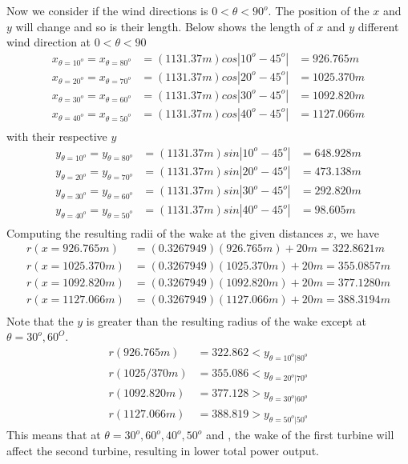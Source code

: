     Now we consider if the wind directions is $0<\theta<90^{o}$. The position of the $x$ and $y$ will change and so is their length. Below shows the length of $x$ and $y$
    different wind direction at $0<\theta<90$   
        \begin{align*}
            x_{\theta=10^{o}} = x_{\theta=80^{o}} &= (1131.37m)cos|10^{o}-45^{o}| &= 926.765m \\ 
            x_{\theta=20^{o}} = x_{\theta=70^{o}} &= (1131.37m)cos|20^{o}-45^{o}| &= 1025.370m \\ 
            x_{\theta=30^{o}} = x_{\theta=60^{o}} &= (1131.37m)cos|30^{o}-45^{o}| &= 1092.820m \\ 
            x_{\theta=40^{o}} = x_{\theta=50^{o}} &= (1131.37m)cos|40^{o}-45^{o}| &= 1127.066m \\ 
        \end{align*}
        with their respective $y$
        \begin{align*}
            y_{\theta=10^{o}} = y_{\theta=80^{o}} &= (1131.37m)sin|10^{o}-45^{o}| &= 648.928m \\ 
            y_{\theta=20^{o}} = y_{\theta=70^{o}} &= (1131.37m)sin|20^{o}-45^{o}| &= 473.138m \\ 
            y_{\theta=30^{o}} = y_{\theta=60^{o}} &= (1131.37m)sin|30^{o}-45^{o}| &= 292.820m \\ 
            y_{\theta=40^{o}} = y_{\theta=50^{o}} &= (1131.37m)sin|40^{o}-45^{o}| &= 98.605m \\ 
        \end{align*}
    Computing the resulting radii of the wake at the given distances $x$, we have
        \begin{align*}
            r(x=926.765m) &= (0.3267949)(926.765m)+20m=322.8621m \\
            r(x=1025.370m) &= (0.3267949)(1025.370m)+20m=355.0857m \\
            r(x=1092.820m) &= (0.3267949)(1092.820m)+20m=377.1280m \\
            r(x=1127.066m) &= (0.3267949)(1127.066m)+20m=388.3194m \\
        \end{align*}
    Note that the $y$ is greater than the resulting radius of the wake except at $\theta=30^{o},60^{O}$.
    	\begin{align*}
    		r(926.765m) &= 322.862 < y_{\theta=10^{o}|80^{o}} \\
    		r(1025/370m) &= 355.086 < y_{\theta=20^{o}|70^{o}} \\
    		r(1092.820m) &= 377.128 > y_{\theta=30^{o}|60^{o}} \\
    		r(1127.066m) &= 388.819 > y_{\theta=50^{o}|50^{o}} 
    	\end{align*}
    This means that at $\theta=30^{o},60^{o},40^{o},50^{o} $ and , the wake of the first turbine will affect the second turbine, resulting in lower total power output.
    
